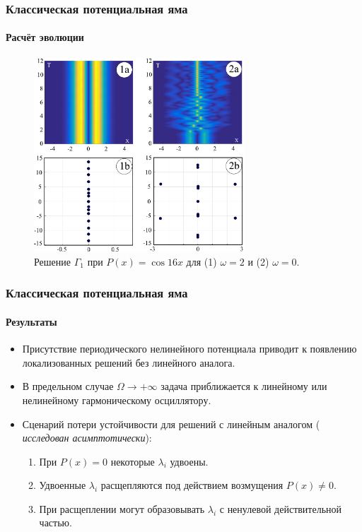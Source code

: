 \documentclass{beamer}
\begin{document}

\begin{frame}
	\frametitle{Классическая потенциальная яма}
	\framesubtitle{Расчёт эволюции}
	
	\begin{figure}
		\includegraphics[width=0.7\textwidth]{pic/evolution.pdf}
		\caption{Решение $\Gamma_1$ при $P(x) = \cos 16 x$ для {\color{ceruleanblue} (1)} $\omega = 2$ и {\color{ceruleanblue} (2)} $\omega = 0$.}
		\label{pic:evolution}
	\end{figure}
\end{frame}

\begin{frame}
	\frametitle{Классическая потенциальная яма}
	\framesubtitle{Результаты\footnotemark[7]}
	
	\begin{itemize}
		\item Присутствие периодического нелинейного потенциала приводит к появлению локализованных решений без линейного аналога.
		\item В предельном случае $\Omega \to +\infty$ задача приближается к линейному или нелинейному гармоническому осциллятору.
		\item Сценарий потери устойчивости для решений с линейным аналогом ({\it {\color{ceruleanblue} исследован асимптотически}}):
		\begin{enumerate}
			\item При $P(x) = 0$ некоторые $\lambda_i$ удвоены.
			\item Удвоенные $\lambda_i$ расщепляются под действием возмущения $P(x) \neq 0$.
			\item При расщеплении могут образовывать $\lambda_i$ с ненулевой действительной частью.
		\end{enumerate}
	\end{itemize}
	
\end{frame}
\end{document}
